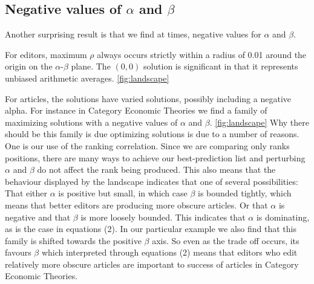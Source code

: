 \documentclass{acm_proc_article-sp}
\begin{document}

\subsection{Negative values of $\alpha$ and $\beta$}
Another surprising result is that we find at times, negative values for $\alpha$ and $\beta$.


For editors, maximum $\rho$ always occurs strictly within a radius of 0.01 around the origin on the  $\alpha$-$\beta$ plane. The $(0,0)$ solution is significant in that it represents unbiased arithmetic averages.
\ref{fig:landscape}

For articles, the solutions have varied solutions, possibly including a negative alpha. For instance in Category Economic Theories we find a family of maximizing solutions with a negative values of $\alpha$ and $\beta$. \ref{fig:landscape} Why there should be this family is due optimizing solutions is due to a number of reasons. One is our use of the ranking correlation. Since we are comparing only ranks positions, there are many ways to achieve our best-prediction list and perturbing $\alpha$ and $\beta$ do not affect the rank being produced. This also means that the behaviour displayed by the  landscape indicates that one of several possibilities: That either $\alpha$ is positive but small, in which case $\beta$ is bounded tightly, which means that better editors are producing more obscure articles. Or that $\alpha$ is negative and that $\beta$ is more loosely bounded. This indicates that $\alpha$ is dominating, as is the case in equations (2). In our particular example we also find that this family is shifted towards the positive $\beta$ axis. So even as the trade off occurs, its favours $\beta$ which interpreted through equations (2) means that editors who edit relatively more obscure articles are important to success of articles in Category Economic Theories.
\end{document}
